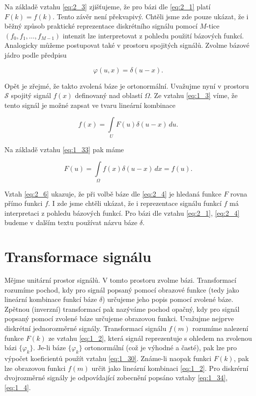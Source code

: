 Na základě vztahu \eqref{eq:2_3} zjišťujeme, že pro bázi dle \eqref{eq:2_1} platí $F(k) = f(k)$. Tento závěr není překvapivý. Chtěli jsme zde pouze ukázat, že i běžný způsob praktické reprezentace diskrétního signálu pomocí $M$-tice $(f_0, f_1, \dots, f_{M-1})$ intenzit lze interpretovat z pohledu použití bázových funkcí. Analogicky můžeme postupovat také v prostoru spojitých signálů. Zvolme bázové jádro podle předpisu

\begin{equation} \label{eq:2_4}
    \varphi(u, x) = \delta(u-x).
\end{equation}

Opět je zřejmé, že takto zvolená báze je ortonormální. Uvažujme nyní v prostoru $\mathcal{S}$ spojitý signál $f(x)$ definovaný nad oblastí $\Omega$. Ze vztahu \eqref{eq:1_3} víme, že tento signál je možné zapsat ve tvaru lineární kombinace

\begin{equation} \label{eq:2_5}
    f(x) = \int\limits_U F(u) \delta(u-x) \,d u.
\end{equation}

Na základě vztahu \eqref{eq:1_33} pak máme

\begin{equation} \label{eq:2_6}
    F(u) = \int\limits_\Omega f(x) \delta(u-x) \,d x = f(u).
\end{equation}

Vztah \eqref{eq:2_6} ukazuje, že při volbě báze dle \eqref{eq:2_4} je hledaná funkce $F$ rovna přímo funkci $f$. I zde jsme chtěli ukázat, že i reprezentace signálu funkcí $f$ má interpretaci z pohledu bázových funkcí. Pro bázi dle vztahu \eqref{eq:2_1}, \eqref{eq:2_4} budeme v dalším textu používat názvu báze $\delta$.

\section*{Transformace signálu} \label{sec:transformace_signalu}

Mějme unitární prostor signálů. V tomto prostoru zvolme bázi. Transformací rozumíme pochod, kdy pro signál popsaný pomocí obrazové funkce (tedy jako lineární kombinace funkcí báze $\delta$) určujeme jeho popis pomocí zvolené báze. Zpětnou (inverzní) transformací pak nazýváme pochod opačný, kdy pro signál popsaný pomocí zvolené báze určujeme obrazovou funkci. Uvažujme nejprve diskrétní jednorozměrné signály. Transformací signálu $f(m)$ rozumíme nalezení funkce $F(k)$ ze vztahu \eqref{eq:1_2}, která signál reprezentuje s ohledem na zvolenou bázi $\{\varphi_k\}$. Je-li báze $\{\varphi_k\}$ ortonormální (což je výhodné a časté), pak lze pro výpočet koeficientů použít vztahu \eqref{eq:1_30}. Známe-li naopak funkci $F(k)$, pak lze obrazovou funkci $f(m)$ určit jako lineární kombinaci \eqref{eq:1_2}. Pro diskrérní dvojrozměrné signály je odpovídající zobecnění popsáno vztahy \eqref{eq:1_34}, \eqref{eq:1_4}.

